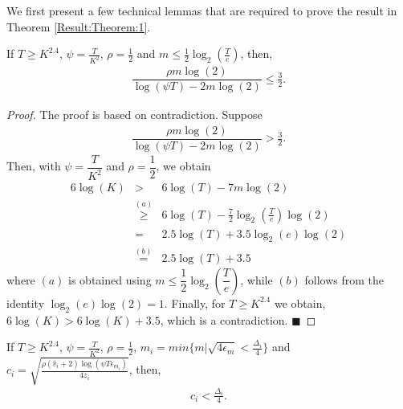 We first present a few technical lemmas that are required  to prove the result in Theorem \ref{Result:Theorem:1}.

\begin{lemma}
\label{proofTheorem:Lemma:1}
If $T\geq K^{2.4}$, $\psi=\frac{T}{ K^2}$, $\rho=\frac{1}{2}$ and $m\leq \frac{1}{2} \log_2\left(\frac{T}{e}\right) $, then,
\begin{align*}
\dfrac{\rho m \log(2)}{\log(\psi T) - 2m\log( 2)} \leq \frac{3}{2}.
\end{align*}
\end{lemma}

\begin{proof}
The proof is based on contradiction. Suppose
\begin{eqnarray*}
\dfrac{\rho m \log(2)}{\log(\psi T) - 2m\log( 2)} > \frac{3}{2}.
\end{eqnarray*}
Then, with $\psi=\dfrac{T}{ K^2}$ and $\rho=\dfrac{1}{2}$, we obtain
\begin{eqnarray*}
6\log(K) 
&>& 6\log(T) - 7m\log(2) \\
&\overset{(a)}{\ge}& 6\log(T) - \frac{7}{2} \log_2\left(\frac{T}{e}\right) \log(2) \\
&=& 2.5\log(T) + 3.5 \log_2(e)\log(2)  \\
&\overset{(b)}{=}& 2.5\log(T) +3.5
\end{eqnarray*}
where $(a)$ is obtained using $m\leq \dfrac{1}{2} \log_2\left(\dfrac{T}{e}\right)$, while $(b)$ follows from the identity $\log_2(e)\log(2) =1$. Finally, for $T\ge K^{2.4}$ we obtain, $6\log(K)>6\log(K)+3.5$, which is a contradiction.
\hfill $\blacksquare$	
\end{proof}


\begin{lemma}
\label{proofTheorem:Lemma:2}
If $T\geq K^{2.4}$, $\psi=\frac{T}{ K^2}$, $\rho =\frac{1}{2}$, $m_i = min\lbrace m|\sqrt{4\epsilon_{m} } < \frac{\Delta_i}{4} \rbrace $ and $c_{i} =\sqrt{\frac{\rho (\hat{v}_i + 2)\log (\psi T\epsilon_{m_{i}})}{4 z_i}}$, then,
\begin{align*}
 c_{i} < \frac{\Delta_i}{4}.
\end{align*}
\end{lemma}


